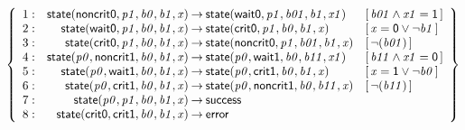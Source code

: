 \documentclass[a4paper]{article}
\def\lthtmlcheckvsize{\ifdim\ht\sizebox<\vsize 
  \ifdim\wd\sizebox<\hsize\expandafter\hfill\fi \expandafter\vfill
  \else\expandafter\vss\fi}%
\begin{document}
{\newpage\clearpage
{}%
$\displaystyle \left\{
\begin{array}{rr@{\>}c@{\>}ll}
\mathrm{1} : 
 & \mathsf{state}(\mathsf{noncrit0},\mathit{p1},\mathit{b0},\mathit{b1},\mathit{x})
 & \to 
 & \mathsf{state}(\mathsf{wait0},\mathit{p1},\mathit{b01},\mathit{b1},\mathit{x1})
 & [\, \mathit{b01} \land \mathit{x1} = \mathsf{1} \,]\\
\par
\mathrm{2} : 
 & \mathsf{state}(\mathsf{wait0},\mathit{p1},\mathit{b0},\mathit{b1},\mathit{x})
 & \to 
 & \mathsf{state}(\mathsf{crit0},\mathit{p1},\mathit{b0},\mathit{b1},\mathit{x})
 & [\, \mathit{x} = \mathsf{0} \lor \neg \mathit{b1} \,]\\
\par
\mathrm{3} : 
 & \mathsf{state}(\mathsf{crit0},\mathit{p1},\mathit{b0},\mathit{b1},\mathit{x})
 & \to 
 & \mathsf{state}(\mathsf{noncrit0},\mathit{p1},\mathit{b01},\mathit{b1},\mathit{x})
 & [\, \neg(\mathit{b01}) \,]\\
\par
\mathrm{4} : 
 & \mathsf{state}(\mathit{p0},\mathsf{noncrit1},\mathit{b0},\mathit{b1},\mathit{x})
 & \to 
 & \mathsf{state}(\mathit{p0},\mathsf{wait1},\mathit{b0},\mathit{b11},\mathit{x1})
 & [\, \mathit{b11} \land \mathit{x1} = \mathsf{0} \,]\\
\par
\mathrm{5} : 
 & \mathsf{state}(\mathit{p0},\mathsf{wait1},\mathit{b0},\mathit{b1},\mathit{x})
 & \to 
 & \mathsf{state}(\mathit{p0},\mathsf{crit1},\mathit{b0},\mathit{b1},\mathit{x})
 & [\, \mathit{x} = \mathsf{1} \lor \neg \mathit{b0} \,]\\
\par
\mathrm{6} : 
 & \mathsf{state}(\mathit{p0},\mathsf{crit1},\mathit{b0},\mathit{b1},\mathit{x})
 & \to 
 & \mathsf{state}(\mathit{p0},\mathsf{noncrit1},\mathit{b0},\mathit{b11},\mathit{x})
 & [\, \neg(\mathit{b11}) \,]\\
\par
\mathrm{7} : 
 & \mathsf{state}(\mathit{p0},\mathit{p1},\mathit{b0},\mathit{b1},\mathit{x})
 & \to 
 & \mathsf{success}\\
\par
\mathrm{8} : 
 & \mathsf{state}(\mathsf{crit0},\mathsf{crit1},\mathit{b0},\mathit{b1},\mathit{x})
 & \to 
 & \mathsf{error}\\
\par
\end{array}
\right\}
$%
\lthtmlindisplaymathZ
\lthtmlcheckvsize\clearpage}
\end{document}
